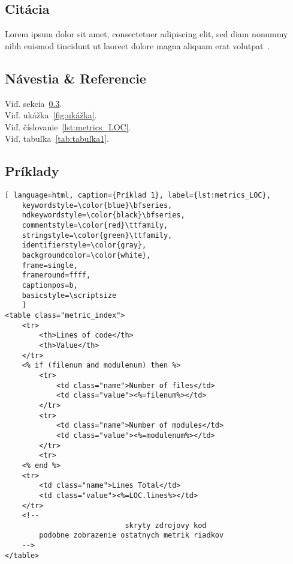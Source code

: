 \subsection{Citácia}
Lorem ipsum dolor sit amet, consectetuer adipiscing elit, sed diam nonummy nibh euismod tincidunt ut laoreet dolore magna aliquam erat volutpat~\cite{1}.

\subsection{Návestia \& Referencie}
Viď. sekcia~\ref{sec:Príklady}.\\
Viď. ukážka~\ref{fig:ukážka}.\\
Viď. číslovanie~\ref{lst:metrics_LOC}.\\
Viď. tabuľka~\ref{tab:tabuľka1}.

\subsection{Príklady}
\label{sec:Príklady}

\begin{lstlisting}[ language=html, caption={Príklad 1}, label={lst:metrics_LOC},
	keywordstyle=\color{blue}\bfseries,
	ndkeywordstyle=\color{black}\bfseries,
	commentstyle=\color{red}\ttfamily,
	stringstyle=\color{green}\ttfamily,
	identifierstyle=\color{gray},
	backgroundcolor=\color{white}, 
	frame=single, 
	frameround=ffff,
	captionpos=b,
	basicstyle=\scriptsize
	]
<table class="metric_index">
	<tr>
		<th>Lines of code</th>
		<th>Value</th>
	</tr>
	<% if (filenum and modulenum) then %>
		<tr>
			<td class="name">Number of files</td>
			<td class="value"><%=filenum%></td>
		</tr>
		<tr>
			<td class="name">Number of modules</td>
			<td class="value"><%=modulenum%></td>
		</tr>
		<tr>
	<% end %>
	<tr>
		<td class="name">Lines Total</td>
		<td class="value"><%=LOC.lines%></td>
	</tr>
	<!--
							skryty zdrojovy kod
		podobne zobrazenie ostatnych metrik riadkov
	-->
</table>
\end{lstlisting}

